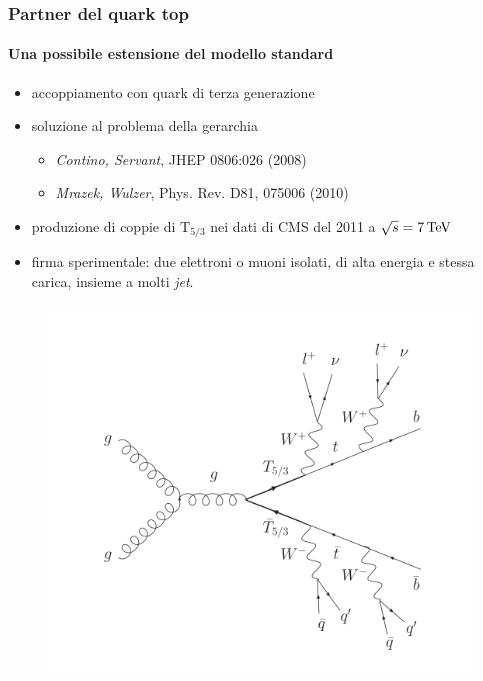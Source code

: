 \documentclass[italian]{beamer}
\begin{document}
\begin{frame}
    \frametitle{Partner del quark top}
    \framesubtitle{Una possibile estensione del modello standard}
    \begin{itemize}
        \item accoppiamento con quark di terza generazione
        \item soluzione al problema della gerarchia
            \begin{itemize}
                \item \emph{Contino, Servant}, JHEP 0806:026 (2008)
                \item \emph{Mrazek, Wulzer}, Phys. Rev. D81, 075006 (2010)
            \end{itemize}
        \item produzione di coppie di $\mathrm{T}_{5/3}$ nei dati di CMS del
            2011 a $\sqrt{s} = \unit[7]{TeV}$
        \item \alert{firma sperimentale: due elettroni o muoni isolati, di alta energia e
                stessa carica, insieme a molti \emph{jet}.}
    \end{itemize}
    \begin{figure}[h]
        \centering
        \includegraphics[height=.5\textheight]{TTbar_feynman}
    \end{figure}
\end{frame}
\end{document}
